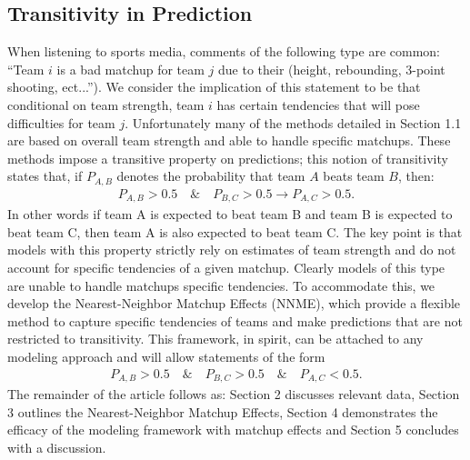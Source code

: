 \documentclass[letterpaper,12pt]{article}
\begin{document}
\subsection{Transitivity in Prediction}
When listening to sports media, comments of the following type are common: ``Team $i$ is a bad matchup for team $j$ due to their (height, rebounding, 3-point shooting, ect...''). We consider the implication of this statement to be that conditional on team strength, team $i$ has certain tendencies that will pose difficulties for team $j$. Unfortunately many of the methods detailed in Section 1.1 are based on overall team strength and able to handle specific matchups. These methods impose a transitive property on predictions; this notion of transitivity states that, if $P_{A,B}$ denotes the probability that team $A$ beats team $B$, then: 
\begin{eqnarray}
P_{A,B} > 0.5 \quad \& \quad P_{B,C} > 0.5 \rightarrow P_{A,C} > 0.5.
\label{eq:trans}
\end{eqnarray}
In other words if team A is expected to beat team B and team B is expected to beat team C, then team A is also expected to beat team C. The key point is that models with this property strictly rely on estimates of team strength and do not account for specific tendencies of a given matchup. Clearly models of this type are unable to handle matchups specific tendencies. To accommodate this, we develop the Nearest-Neighbor Matchup Effects (NNME), which provide a flexible method to capture specific tendencies of teams and make predictions that are not restricted to transitivity. This framework, in spirit, can be attached to any modeling approach and will allow statements of the form
\begin{eqnarray*}
P_{A,B} > 0.5 \quad \& \quad P_{B,C} > 0.5 \quad \& \quad P_{A,C} < 0.5.
\label{eq:trans}
\end{eqnarray*}
The remainder of the article follows as: Section 2 discusses relevant data, Section 3 outlines the Nearest-Neighbor Matchup Effects, Section 4 demonstrates the efficacy of the modeling framework with matchup effects and Section 5 concludes with a discussion.
\end{document}
